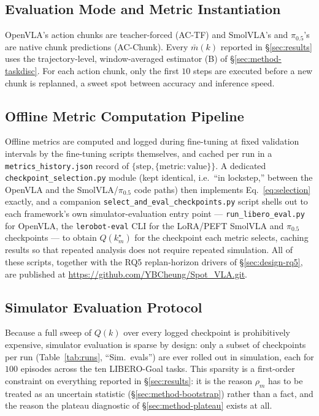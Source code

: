 \documentclass[english,12pt,a4paper,pdftex,elec,utf8]{aaltothesis}
\begin{document}
\subsection{Evaluation Mode and Metric Instantiation}
\label{sec:implementation-mode}

OpenVLA's action chunks are teacher-forced (AC-TF) and SmolVLA's and $\pi_{0.5}$'s are native chunk predictions (AC-Chunk). Every $\bar m(k)$ reported in \S\ref{sec:results} uses the trajectory-level, window-averaged estimator (B) of \S\ref{sec:method-taskdisc}. For each action chunk, only the first $10$ steps are executed before a new chunk is replanned, a sweet spot between accuracy and inference speed.

\subsection{Offline Metric Computation Pipeline}
\label{sec:implementation-pipeline}

Offline metrics are computed and logged during fine-tuning at fixed validation intervals by the fine-tuning scripts themselves, and cached per run in a \texttt{metrics\_history.json} record of $\{\text{step}, \{\text{metric}:\text{value}\}\}$. A dedicated \texttt{checkpoint\_selection.py} module (kept identical, i.e.\ ``in lockstep,'' between the OpenVLA and the SmolVLA/$\pi_{0.5}$ code paths) then implements Eq.~\ref{eq:selection} exactly, and a companion \texttt{select\_and\_eval\_checkpoints.py} script shells out to each framework's own simulator-evaluation entry point --- \texttt{run\_libero\_eval.py}
for OpenVLA, the \texttt{lerobot-eval} CLI for the LoRA/PEFT SmolVLA and $\pi_{0.5}$ checkpoints --- to obtain $Q(k_m^\star)$ for the checkpoint each metric selects, caching results so that repeated analysis does not require repeated simulation. All of these scripts, together with the RQ5 replan-horizon drivers of \S\ref{sec:design-rq5}, are published at \url{https://github.com/YBCheung/Spot_VLA.git}.

\subsection{Simulator Evaluation Protocol}
\label{sec:implementation-sim}

Because a full sweep of $Q(k)$ over every logged checkpoint is prohibitively expensive, simulator evaluation is sparse by design: only a subset of checkpoints per run (Table~\ref{tab:runs}, ``Sim.\ evals'') are ever rolled out in simulation, each for $100$ episodes across the ten LIBERO-Goal tasks.
This sparsity is a first-order constraint on everything reported in \S\ref{sec:results}: it is the reason $\rho_m$ has to be treated as an uncertain statistic (\S\ref{sec:method-bootstrap}) rather than a fact, and the reason the plateau diagnostic of \S\ref{sec:method-plateau} exists at all.
\end{document}
